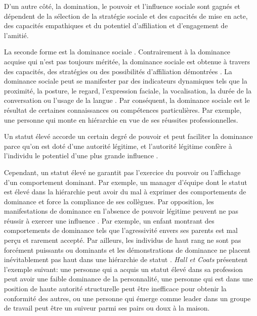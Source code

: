  	D'un autre côté, la domination, le pouvoir et l'influence sociale sont gagnés et dépendent de la sélection de la stratégie sociale et des capacités de mise en acte, des capacités empathiques et du potentiel d'affiliation et d'engagement de l'amitié.
	
	La seconde forme est la dominance sociale \cite{liska1990dominance}. Contrairement à la dominance acquise qui n'est pas toujours méritée, la dominance sociale est obtenue à travers des capacités, des stratégies ou des possibilités d'affiliation démontrées \cite{burgoon1998nature}.  La dominance sociale peut se manifester par des indicateurs dynamiques tels que la proximité, la posture, le regard, l'expression faciale, la vocalisation, la durée de la conversation ou l'usage de la langue \cite{keating1985human}. Par conséquent, la dominance sociale est le résultat de certaines connaissances ou compétences particulières. Par exemple, une personne qui monte en hiérarchie en vue de ses réussites professionnelles.
		
	Un statut élevé accorde un certain degré de pouvoir et peut faciliter la dominance parce qu'on est doté d'une autorité légitime, et l'autorité légitime confère à l'individu le potentiel d'une plus grande influence \cite{burgoon2006nonverbal}. 
	
	Cependant, un statut élevé ne garantit pas l'exercice du pouvoir ou l'affichage d'un comportement dominant. Par exemple, un manager d'équipe dont le statut est élevé dans la hiérarchie peut avoir du mal à exprimer des comportements de dominance et force la compliance de ses collègues. Par opposition, les manifestations de dominance en l'absence de pouvoir légitime peuvent ne pas réussir à exercer une influence \cite{ridgeway1995legitimacy}. Par exemple, un enfant montrant des comportements de dominance tels que l'agressivité envers ses parents est mal perçu et rarement accepté.
	Par ailleurs, les individus de haut rang ne sont pas forcément puissants ou dominants et les démonstrations de dominance ne placent inévitablement pas haut dans une hiérarchie de statut \cite{burgoonnonverbal}. \emph{Hall et Coats} \cite{hall2005nonverbal} présentent l'exemple suivant: une personne qui a acquis un statut élevé dans sa profession peut avoir une faible dominance de la personnalité, une personne qui est dans une position de haute autorité structurelle peut être inefficace pour obtenir la conformité des autres, ou une personne qui émerge comme leader dans un groupe de travail peut être un suiveur parmi ses pairs ou doux à la maison.
	
